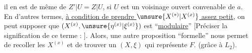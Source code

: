 il en est de même de $Z'|U=Z|U$, si $U$ est un voisinage ouvert convenable de $a$. En d'autres termes, \uline{à condition de prendre $\unsure{X^{(*)}|X^{(x)}}$ assez petit}, on peut supposer que $(X^{(x)},\unsure{\eta^{(x)}|\xi^{(x)}})$ est ``\uline{modulaire}'' [Préciser la signification de ce terme : ]. Alors, une autre proposition ``formelle'' nous permet de recoller les $X^{(x)}$ et de trouver un $(X,\xi)$ qui représente $F$. (grâce à $L_2$).
